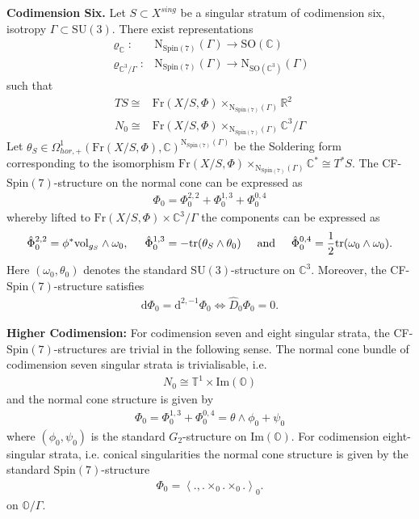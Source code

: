 \documentclass[psamsfonts]{amsart}
\theoremstyle{plain}
\theoremstyle{definition}{
\newtheorem{defi}{Definition}[section]
\newtheorem{ass}{Assumption}
\newtheorem*{nota}{Notation}}
\theoremstyle{remark}{
\newtheorem{rem}{Remark}
\newtheorem{ex}{Example}}
\theoremstyle{plain}{
\newtheorem{thm}{Theorem}[section]
\newtheorem{lem}{Lemma}[section]
\newtheorem{cor}{Corollary}[section]
\newtheorem{prop}{Proposition}[section]
\newtheorem{con}{Conjecture}[section]}
\newcommand{\m}[1]{{\mathrm{#1}}}
\newcommand{\und}[1]{\hspace{#1}\text{and}\hspace{#1}}
\begin{document}
\textbf{Codimension Six.} Let $S\subset X^{sing}$ be a singular stratum of codimension six, isotropy $\Gamma\subset\m{SU}(3)$. There exist representations 
\begin{align*}
    \varrho_{\mathbb{C}}\colon &\m{N}_{\m{Spin}(7)}(\Gamma)\rightarrow \m{SO}(\mathbb{C})\\
    \varrho_{\mathbb{C}^3/\Gamma}\colon &\m{N}_{\m{Spin}(7)}(\Gamma)\rightarrow \m{N}_{\m{SO}(\mathbb{C}^3)}(\Gamma)
\end{align*}
such that 
\begin{align*}
    TS\cong&\m{Fr}(X/S,\Phi)\times_{\m{N}_{\m{Spin}(7)}(\Gamma)}\mathbb{R}^2\\
    N_0\cong& \m{Fr}(X/S,\Phi)\times_{\m{N}_{\m{Spin}(7)}(\Gamma)}\mathbb{C}^3/\Gamma
\end{align*}
Let $\theta_{S}\in\Omega^1_{hor,+}(\m{Fr}(X/S,\Phi),\mathbb{C})^{\m{N}_{\m{Spin}(7)}(\Gamma)}$ be the Soldering form corresponding to the isomorphism $\m{Fr}(X/S,\Phi)\times_{\m{N}_{\m{Spin}(7)}(\Gamma)}\mathbb{C}^*\cong T^* S$. The CF-$\m{Spin}(7)$-structure on the normal cone can be expressed as 
\begin{align*}
    \Phi_0=\Phi^{2,2}_0+\Phi^{1,3}_0+\Phi^{0,4}_0
\end{align*}
whereby lifted to $\m{Fr}(X/S,\Phi)\times \mathbb{C}^3/\Gamma$ the components can be expressed as
\begin{align*}
    \hat{\Phi}^{2,2}_0=\phi^*\m{vol}_{g_S}\wedge\omega_0,\hspace{0,5cm}\hat{\Phi}^{1,3}_0=-\m{tr}(\theta_{S}\wedge\theta_0)\und{0.5cm}\hat{\Phi}^{0,4}_0=\frac{1}{2}\m{tr}(\omega_0\wedge\omega_0).
\end{align*}
Here $(\omega_0,\theta_0)$ denotes the standard $\m{SU}(3)$-structure on $\mathbb{C}^3$. Moreover, the CF-$\m{Spin}(7)$-structure satisfies 
\begin{align*}
    \m{d}\Phi_0=\m{d}^{2,-1}\Phi_0\Leftrightarrow \widehat{D}_{0}\Phi_0=0.
\end{align*}

\textbf{Higher Codimension:} For codimension seven and eight singular strata, the CF-$\m{Spin}(7)$-structures are trivial in the following sense. The normal cone bundle of codimension seven singular strata is trivialisable, i.e. 
\begin{align*}
    N_0\cong\mathbb{T}^1\times \m{Im}(\mathbb{O})
\end{align*}
and the normal cone structure is given by 
\begin{align*}
    \Phi_0=\Phi_0^{1,3}+\Phi_0^{0,4}=\theta\wedge\phi_0 +\psi_0
\end{align*}
where $(\phi_0,\psi_0)$ is the standard $G_2$-structure on $\m{Im}(\mathbb{O})$. For codimension eight-singular strata, i.e. conical singularities the normal cone structure is given by the standard $\m{Spin}(7)$-structure 
\begin{align*}
    \Phi_0=\left<.,.\times_0.\times_0.\right>_0.
\end{align*}
on $\mathbb{O}/\Gamma$.\\
\end{document}
